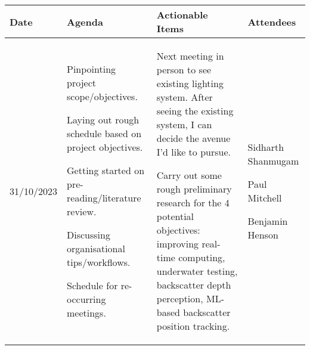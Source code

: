 \begin{table}[!h]
    \centering
    \begin{tabularx}{\textwidth}{|l|X|X|X|}
        \hline
        Date & Agenda & Actionable Items & Attendees \\
        \hline
        \hline
        31/10/2023 & 
        \begin{myitemize}
            \item Pinpointing project scope/objectives.
            \item Laying out rough schedule based on project objectives.
            \item Getting started on pre-reading/literature review.
            \item Discussing organisational tips/workflows.
            \item Schedule for re-occurring meetings.
        \end{myitemize} & 
        \begin{myitemize}
            \item Next meeting in person to see existing lighting system. After seeing the existing system, I can decide the avenue I'd like to pursue.
            \item Carry out some rough preliminary research for the 4 potential objectives: improving real-time computing, underwater testing, backscatter depth perception, ML-based backscatter position tracking.
        \end{myitemize} & 
        \begin{myitemize}
            \item Sidharth Shanmugam
            \item Paul Mitchell
            \item Benjamin Henson
        \end{myitemize} \\
        \hline
    \end{tabularx}
\end{table}
